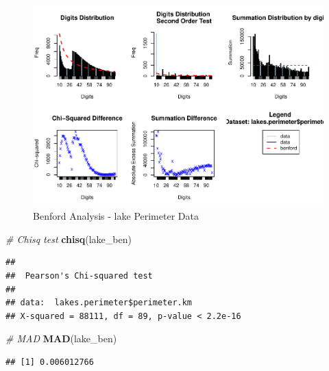 \documentclass[
]{book}
\newenvironment{Shaded}{\begin{snugshade}}{\end{snugshade}}
\newcommand{\CommentTok}[1]{\textcolor[rgb]{0.56,0.35,0.01}{\textit{#1}}}
\newcommand{\FunctionTok}[1]{\textcolor[rgb]{0.13,0.29,0.53}{\textbf{#1}}}
\newcommand{\NormalTok}[1]{#1}
\newcommand{\SpecialCharTok}[1]{\textcolor[rgb]{0.81,0.36,0.00}{\textbf{#1}}}
\begin{document}
\begin{figure}

{\centering \includegraphics{DauR_files/figure-latex/unnamed-chunk-391-1} 

}

\caption{Benford Analysis - lake Perimeter Data}\label{fig:unnamed-chunk-391}
\end{figure}

\begin{Shaded}
\begin{Highlighting}[]
\CommentTok{\# Chisq test}
\FunctionTok{chisq}\NormalTok{(lake\_ben)}
\end{Highlighting}
\end{Shaded}

\begin{verbatim}
## 
##  Pearson's Chi-squared test
## 
## data:  lakes.perimeter$perimeter.km
## X-squared = 88111, df = 89, p-value < 2.2e-16
\end{verbatim}

\begin{Shaded}
\begin{Highlighting}[]
\CommentTok{\# MAD}
\FunctionTok{MAD}\NormalTok{(lake\_ben)}
\end{Highlighting}
\end{Shaded}

\begin{verbatim}
## [1] 0.006012766
\end{verbatim}

\begin{Shaded}
\end{Shaded}
\end{document}

